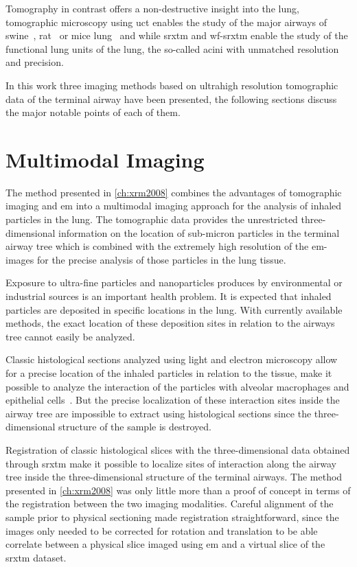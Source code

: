 Tomography in contrast offers a non-destructive insight into the lung, tomographic microscopy using \ac{uct} enables the study of the major airways of swine~\cite{Litzlbauer2006}, rat~\cite{Langheinrich2004a,Sharif2010} or mice lung~\cite{Langheinrich2004,Ritman2005} and while \ac{srxtm} and \ac{wf-srxtm} enable the study of the functional lung units of the lung, the so-called acini with unmatched resolution and precision.

In this work three imaging methods based on ultrahigh resolution tomographic data of the terminal airway have been presented, the following sections discuss the major notable points of each of them.

\section{Multimodal Imaging}
The method presented in \autoref{ch:xrm2008} combines the advantages of tomographic imaging and \ac{em} into a multimodal imaging approach for the analysis of inhaled particles in the lung. The tomographic data provides the unrestricted three-dimensional information on the location of sub-micron particles in the terminal airway tree which is combined with the extremely high resolution of the \ac{em}-images for the precise analysis of those particles in the lung tissue.

Exposure to ultra-fine particles and nanoparticles produces by environmental or industrial sources is an important health problem. It is expected that inhaled particles are deposited in specific locations in the lung. With currently available methods, the exact location of these deposition sites in relation to the airways tree cannot easily be analyzed. 

Classic histological sections analyzed using light and electron microscopy allow for a precise location of the inhaled particles in relation to the tissue, \ie make it possible to analyze the interaction of the particles with alveolar macrophages and epithelial cells~\cite{Muhlfeld2008}. But the precise localization of these interaction sites inside the airway tree are impossible to extract using histological sections since the three-dimensional structure of the sample is destroyed.

Registration of classic histological slices with the three-dimensional data obtained through \ac{srxtm} make it possible to localize sites of interaction along the airway tree inside the three-dimensional structure of the terminal airways. The method presented in \autoref{ch:xrm2008} was only little more than a proof of concept in terms of the registration between the two imaging modalities. Careful alignment of the sample prior to physical sectioning made registration straightforward, since the images only needed to be corrected for rotation and translation to be able correlate between a physical slice imaged using \ac{em} and a virtual slice of the \ac{srxtm} dataset.

